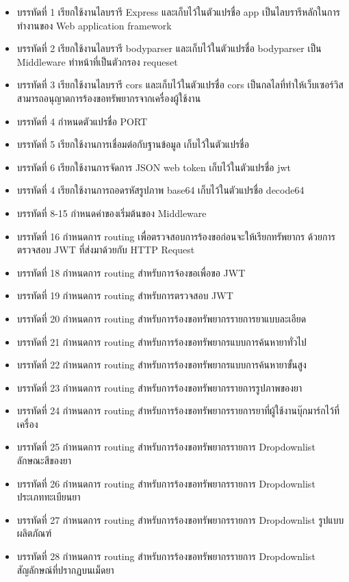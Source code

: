 	\begin{itemize}[label={--}]
		\item บรรทัดที่ 1	เรียกใช้งานไลบรารี Express และเก็บไว้ในตัวแปรชื่อ app เป็นไลบรารีหลักในการทำงานของ Web application framework
		\item บรรทัดที่ 2	เรียกใช้งานไลบรารี bodyparser และเก็บไว้ในตัวแปรชื่อ bodyparser เป็น Middleware ทำหน้าที่เป็นตัวกรอง requeset 
		\item บรรทัดที่ 3	เรียกใช้งานไลบรารี cors และเก็บไว้ในตัวแปรชื่อ cors เป็นกลไลที่ทำให้เว็บเซอร์วิสสามารถอนุญาตการร้องขอทรัพยากรจากเครื่องผู้ใช้งาน
		\item บรรทัดที่ 4	กำหนดตัวแปรชื่อ PORT 
		\item บรรทัดที่ 5	เรียกใช้งานการเชื่อมต่อกับฐานข้อมูล เก็บไว้ในตัวแปรชื่อ 
		\item บรรทัดที่ 6	เรียกใช้งานการจัดการ JSON web token เก็บไว้ในตัวแปรชื่อ jwt
		\item บรรทัดที่ 4	เรียกใช้งานการถอดรหัสรูปภาพ base64 เก็บไว้ในตัวแปรชื่อ decode64
		\item บรรทัดที่ 8-15	กำหนดค่าของเริ่มต้นของ Middleware
		\item บรรทัดที่ 16	กำหนดการ routing เพื่อตรวจสอบการร้องขอก่อนจะให้เรียกทรัพยากร ด้วยการตรวจสอบ JWT ที่ส่งมาด้วยกับ HTTP Request 
		\item บรรทัดที่ 18	กำหนดการ routing สำหรับการจ้องขอเพื่อขอ JWT 
		\item บรรทัดที่ 19	กำหนดการ routing สำหรับการตรวจสอบ JWT
		\item บรรทัดที่ 20	กำหนดการ routing สำหรับการร้องขอทรัพยากรรายการยาแบบละเอียด
		\item บรรทัดที่ 21	กำหนดการ routing สำหรับการร้องขอทรัพยากรแบบการค้นหายาทั่วไป
		\item บรรทัดที่ 22	กำหนดการ routing สำหรับการร้องขอทรัพยากรแบบการค้นหายาขั้นสูง
		\item บรรทัดที่ 23	กำหนดการ routing สำหรับการร้องขอทรัพยากรรายการรูปภาพของยา
		\item บรรทัดที่ 24	กำหนดการ routing สำหรับการร้องขอทรัพยากรรายการยาที่ผู้ใช้งานบุ๊กมาร์กไว้ที่เครื่อง
		\item บรรทัดที่ 25	กำหนดการ routing สำหรับการร้องขอทรัพยากรรายการ Dropdownlist ลักษณะสีของยา
		\item บรรทัดที่ 26	กำหนดการ routing สำหรับการร้องขอทรัพยากรรายการ Dropdownlist ประเภททะเบียนยา
		\item บรรทัดที่ 27	กำหนดการ routing สำหรับการร้องขอทรัพยากรรายการ Dropdownlist รูปแบบผลิตภัณฑ์
		\item บรรทัดที่ 28	กำหนดการ routing สำหรับการร้องขอทรัพยากรรายการ Dropdownlist สัญลักษณ์ที่ปรากฏบนเม็ดยา

\end{itemize}
